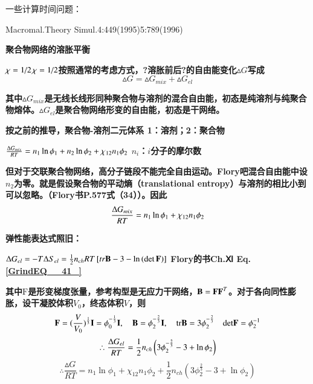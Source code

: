 \documentclass{article} %
\begin{document}
\noindent 一些计算时间问题：

\noindent Macromal.Theory Simul.4:449(1995)5:789(1996)

\noindent \eject 

\noindent \textbf{聚合物网络的溶胀平衡}


{\bf  $\chi ={1\mathord{\left/ {\vphantom {1 2}} \right. \kern-\nulldelimiterspace} 2} $$\chi ={1\mathord{\left/ {\vphantom {1 2}} \right. \kern-\nulldelimiterspace} 2} $按照通常的考虑方式，?溶胀前后?的自由能变化$\vartriangle G$写成
\[\vartriangle G=\vartriangle G_{mix} +\vartriangle G_{el} \] }

{\bf 其中$\vartriangle G_{mix} $是无线长线形同种聚合物与溶剂的混合自由能，初态是纯溶剂与纯聚合物熔体。$\vartriangle G_{el} $是聚合物网络形变的自由能，初态是干网络。}


{\bf  按之前的推导，聚合物-溶剂二元体系        1：溶剂；2：聚合物}

\noindent 
{\bf $\frac{{\rm \Delta }G_{mix} }{RT} =n_{1} \ln \phi _{1} +n_{2} \ln \phi _{2} +\chi _{12} n_{1} \phi _{2} $     $n_{i} $：$i$分子的摩尔数}

\noindent 
{\bf 但对于交联聚合物网络，高分子链段不能完全自由运动。Flory吧混合自由能中设$n_{2} $为零。就是假设聚合物的平动熵（translational entropy）与溶剂的相比小到可以忽略。（Flory书P.577式（34））。因此
\[\frac{{\rm \Delta }G_{mix} }{RT} =n_{1} \ln \phi _{1} +\chi _{12} n_{1} \phi _{2} \] }


{\bf  弹性能表达式照旧：}

\noindent 
{\bf ${\rm \Delta }G_{el} =-T{\rm \Delta }S_{el} =\frac{1}{2} n_{ch} RT\left[tr\boldsymbol{\mathrm{B}}-3-\ln \left(\det \boldsymbol{\mathrm{F}}\right)\right]$ Flory的书Ch.Ⅺ Eq.\eqref{GrindEQ__41_}}

\noindent 
{\bf 其中$\boldsymbol{\mathrm{F}}$是形变梯度张量，参考构型是无应力干网络，$\boldsymbol{\mathrm{{\rm B} }}=\boldsymbol{\mathrm{FF}}^{T} $。对于各向同性膨胀，设干凝胶体积$V_{0} $，终态体积$V$，则
\[\boldsymbol{\mathrm{F}}=(\frac{V}{V_{0} } )^{\frac{1}{3} } \boldsymbol{\mathrm{I}}=\phi _{0}^{-\frac{1}{3} } \boldsymbol{\mathrm{I}},\quad \boldsymbol{\mathrm{B}}=\phi _{2}^{-\frac{2}{3} } \boldsymbol{\mathrm{I}},\quad {\rm tr}\boldsymbol{\mathrm{B}}=3\phi _{2}^{-\frac{2}{3} } \quad {\rm det}\boldsymbol{\mathrm{F}}=\phi _{2}^{-1} \] 
\[\therefore \frac{{\rm \Delta }G_{el} }{RT} =\frac{1}{2} n_{ch} \left(3\phi _{2}^{-\frac{2}{3} } -3+\ln \phi _{2} \right)\] 
\[\therefore \frac{\vartriangle G}{RT} =n_{1} \ln \phi _{1} +\chi _{12} n_{1} \phi _{2} +\frac{1}{2} n_{ch} \left(3\phi _{2}^{\frac{2}{3} } -3+\ln \phi _{2} \right)\] }
\end{document}
